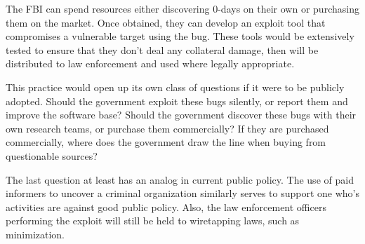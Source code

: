 \documentclass[12pt]{turabian-researchpaper}
\begin{document}
The FBI can spend resources either discovering 0-days on their own or purchasing them on the market.
Once obtained, they can develop an exploit tool that compromises a vulnerable target using the bug.
These tools would be extensively tested to ensure that they don't deal any collateral damage, then will be distributed to law enforcement and used where legally appropriate.

This practice would open up its own class of questions if it were to be publicly adopted.
Should the government exploit these bugs silently, or report them and improve the software base?
Should the government discover these bugs with their own research teams, or purchase them commercially?
If they are purchased commercially, where does the government draw the line when buying from questionable sources?

The last question at least has an analog in current public policy.
The use of paid informers to uncover a criminal organization similarly serves to support one who's activities are against good public policy.
Also, the law enforcement officers performing the exploit will still be held to wiretapping laws, such as minimization.



\pagebreak

\theendnotes

\printbibliography
\end{document}
